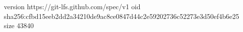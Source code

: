 version https://git-lfs.github.com/spec/v1
oid sha256:cfbd15eeb2dd2a34210de9ac8ce0847d44c2e59202736c52273e3d50ef4b6e25
size 43840
